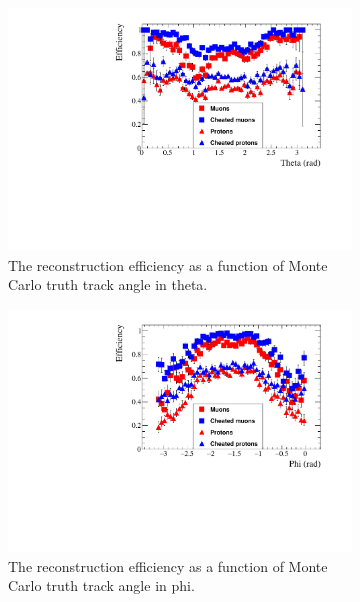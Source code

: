 \begin{figure}[h!]
  \begin{subfigure}{.45\textwidth}
        \centering
        \includegraphics[width=\textwidth]{Effic_SingSamps_Theta}
        \caption{The reconstruction efficiency as a function of Monte Carlo truth track angle in theta.}
        \label{fig:Isol_Effic_Theta}
  \end{subfigure}
  \hspace{0.08\textwidth}
  \begin{subfigure}{.45\textwidth}
        \centering
        \includegraphics[width=\textwidth]{Effic_SingSamps_Phi}
        \caption{The reconstruction efficiency as a function of Monte Carlo truth track angle in phi.}
        \label{fig:Isol_Effic_Phi}
  \end{subfigure}
  \begin{subfigure}{.45\textwidth}

\end{subfigure}
\end{figure}
